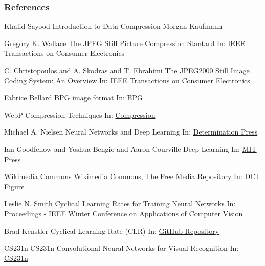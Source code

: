 \documentclass{beamer}
\begin{document}
\begin{frame}[allowframebreaks]
\frametitle{References}
\footnotesize{
\begin{thebibliography}{99} %
 Khalid Sayood
\newblock Introduction to Data Compression
\newblock Morgan Kaufmann

 Gregory K. Wallace
\newblock The JPEG Still Picture Compression Stantard
\newblock In: IEEE Transactions on Consumer Electronics

 C. Christopoulos and A. Skodras and T. Ebrahimi
\newblock The JPEG2000 Still Image Coding System: An Overview
\newblock In: IEEE Transactions on Consumer Electronics

 Fabrice Bellard
\newblock BPG image format
\newblock In: \href{https://bellard.org/bpg/}{BPG}

 WebP
\newblock Compression Techniques 
\newblock In: \href{https://developers.google.com/speed/webp/docs/compression}{Compression}

 Michael A. Nielsen
\newblock Neural Networks and Deep Learning
\newblock In: \href{http://neuralnetworksanddeeplearning.com/}{Determination Press}

 Ian Goodfellow and Yoshua Bengio and Aaron Courville
\newblock Deep Learning
\newblock In: \href{http://www.deeplearningbook.org}{MIT Press}

 Wikimedia Commons
\newblock Wikimedia Commons, The Free Media Repository
\newblock In: \href{https://commons.wikimedia.org/w/index.php?curid=10414002}{DCT Figure}

 Leslie N. Smith
\newblock Cyclical Learning Rates for Training Neural Networks
\newblock In: Proceedings - IEEE Winter Conference on Applications of Computer Vision

 Brad Kenstler
\newblock Cyclical Learning Rate (CLR)
\newblock In: \href{https://github.com/bckenstler/CLR/}{GitHub Repository}

 CS231n
\newblock CS231n Convolutional Neural Networks for Visual Recognition
\newblock In: \href{http://cs231n.github.io/convolutional-networks}{CS231n}


\end{thebibliography}}
\end{frame}
\end{document}
